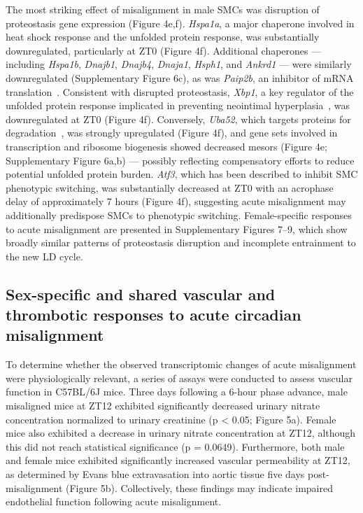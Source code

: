 \documentclass[12pt]{article}
\begin{document}
The most striking effect of misalignment in male SMCs was disruption of proteostasis gene expression
(Figure 4e,f). \textit{Hspa1a}, a major chaperone involved in heat shock response and
the unfolded protein response, was substantially downregulated, particularly at ZT0
(Figure 4f). Additional chaperones --- including \textit{Hspa1b}, \textit{Dnajb1},
\textit{Dnajb4}, \textit{Dnaja1}, \textit{Hsph1}, and \textit{Ankrd1} --- were similarly
downregulated (Supplementary Figure 6c), as was \textit{Paip2b}, an inhibitor of mRNA
translation~\cite{ref107}.
Consistent with disrupted proteostasis, \textit{Xbp1}, a key regulator of the
unfolded protein response implicated in preventing neointimal hyperplasia~\cite{ref105}, was
downregulated at ZT0 (Figure 4f). Conversely, \textit{Uba52}, which targets proteins for
degradation~\cite{ref108,ref109}, was strongly upregulated (Figure 4f), and gene sets
involved in transcription and ribosome biogenesis showed decreased mesors
(Figure 4e; Supplementary Figure 6a,b) --- possibly reflecting
compensatory efforts to reduce potential unfolded protein burden. \textit{Atf3}, which has been described
to inhibit SMC phenotypic switching, was substantially decreased at ZT0 with an acrophase delay of
approximately 7 hours (Figure 4f), suggesting acute misalignment may additionally
predispose SMCs to phenotypic switching. Female-specific responses to acute misalignment are presented
in Supplementary Figures 7--9, which show broadly similar patterns of proteostasis disruption and incomplete entrainment to the new LD cycle.

\subsection*{Sex-specific and shared vascular and thrombotic responses to acute circadian misalignment}
To determine whether the observed transcriptomic changes of acute misalignment were physiologically relevant, a series of assays were conducted to assess vascular function in C57BL/6J mice.
Three days following a 6-hour phase advance, male misaligned mice at ZT12 exhibited significantly decreased urinary nitrate concentration normalized to urinary creatinine (p < 0.05; Figure 5a).
Female mice also exhibited a decrease in urinary nitrate concentration at ZT12, although this did not reach statistical significance (p = 0.0649).
Furthermore, both male and female mice exhibited significantly increased vascular permeability at ZT12, as determined by Evans blue extravasation into aortic tissue five days post-misalignment (Figure 5b). 
Collectively, these findings may indicate impaired endothelial function following acute misalignment.
\end{document}

